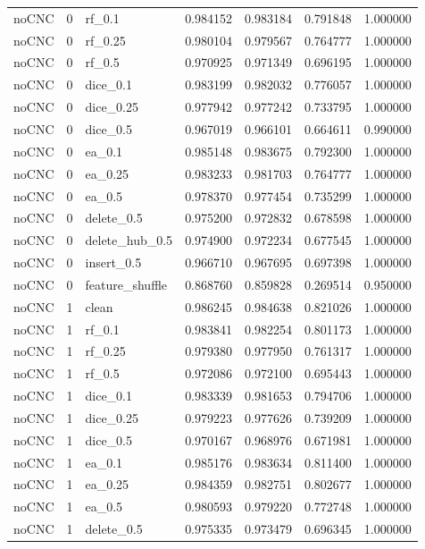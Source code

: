 \documentclass[UTF8,a4paper,11pt,fontset=fandol]{ctexart}
\begin{document}
{\begin{longtable}{lrlrrrr}
noCNC & 0 & rf\_0.1 & 0.984152 & 0.983184 & 0.791848 & 1.000000 \\
noCNC & 0 & rf\_0.25 & 0.980104 & 0.979567 & 0.764777 & 1.000000 \\
noCNC & 0 & rf\_0.5 & 0.970925 & 0.971349 & 0.696195 & 1.000000 \\
noCNC & 0 & dice\_0.1 & 0.983199 & 0.982032 & 0.776057 & 1.000000 \\
noCNC & 0 & dice\_0.25 & 0.977942 & 0.977242 & 0.733795 & 1.000000 \\
noCNC & 0 & dice\_0.5 & 0.967019 & 0.966101 & 0.664611 & 0.990000 \\
noCNC & 0 & ea\_0.1 & 0.985148 & 0.983675 & 0.792300 & 1.000000 \\
noCNC & 0 & ea\_0.25 & 0.983233 & 0.981703 & 0.764777 & 1.000000 \\
noCNC & 0 & ea\_0.5 & 0.978370 & 0.977454 & 0.735299 & 1.000000 \\
noCNC & 0 & delete\_0.5 & 0.975200 & 0.972832 & 0.678598 & 1.000000 \\
noCNC & 0 & delete\_hub\_0.5 & 0.974900 & 0.972234 & 0.677545 & 1.000000 \\
noCNC & 0 & insert\_0.5 & 0.966710 & 0.967695 & 0.697398 & 1.000000 \\
noCNC & 0 & feature\_shuffle & 0.868760 & 0.859828 & 0.269514 & 0.950000 \\
noCNC & 1 & clean & 0.986245 & 0.984638 & 0.821026 & 1.000000 \\
noCNC & 1 & rf\_0.1 & 0.983841 & 0.982254 & 0.801173 & 1.000000 \\
noCNC & 1 & rf\_0.25 & 0.979380 & 0.977950 & 0.761317 & 1.000000 \\
noCNC & 1 & rf\_0.5 & 0.972086 & 0.972100 & 0.695443 & 1.000000 \\
noCNC & 1 & dice\_0.1 & 0.983339 & 0.981653 & 0.794706 & 1.000000 \\
noCNC & 1 & dice\_0.25 & 0.979223 & 0.977626 & 0.739209 & 1.000000 \\
noCNC & 1 & dice\_0.5 & 0.970167 & 0.968976 & 0.671981 & 1.000000 \\
noCNC & 1 & ea\_0.1 & 0.985176 & 0.983634 & 0.811400 & 1.000000 \\
noCNC & 1 & ea\_0.25 & 0.984359 & 0.982751 & 0.802677 & 1.000000 \\
noCNC & 1 & ea\_0.5 & 0.980593 & 0.979220 & 0.772748 & 1.000000 \\
noCNC & 1 & delete\_0.5 & 0.975335 & 0.973479 & 0.696345 & 1.000000 \\

\end{longtable}}
\end{document}
